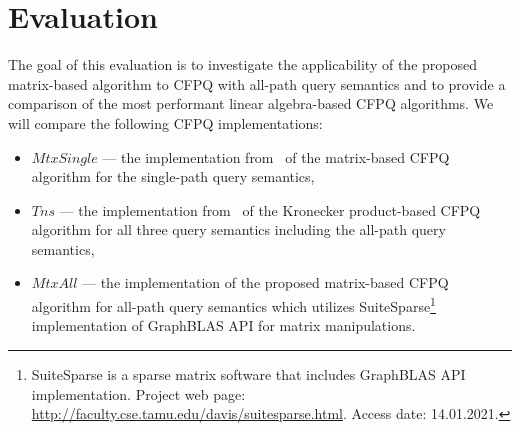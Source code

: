 \section{Evaluation}
The goal of this evaluation is to investigate the applicability of the proposed matrix-based algorithm to CFPQ with all-path query semantics and to provide a comparison of the most performant linear algebra-based CFPQ algorithms. We will compare the following CFPQ implementations:
\begin{itemize}
	\item $MtxSingle$ --- the implementation from~\cite{10.1145/3398682.3399163} of the matrix-based CFPQ algorithm for the single-path query semantics,
	\item $Tns$ --- the implementation from~\cite{kron} of the Kronecker product-based CFPQ algorithm for all three query semantics including the all-path query semantics,
	\item $MtxAll$ --- the implementation of the proposed matrix-based CFPQ algorithm for all-path query semantics which utilizes SuiteSparse\footnote{SuiteSparse is a sparse matrix software that includes GraphBLAS API implementation. Project web page: \url{http://faculty.cse.tamu.edu/davis/suitesparse.html}. Access date: 14.01.2021.}~\cite{Davis2018Algorithm9S} implementation of GraphBLAS API for matrix manipulations.
\end{itemize}
